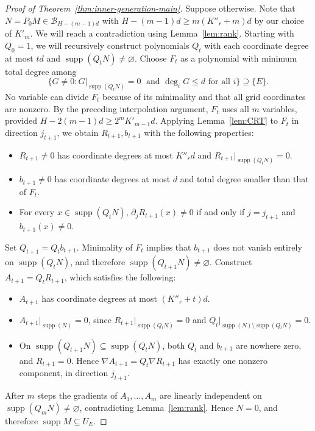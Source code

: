 \documentclass[11pt,letterpaper]{article}
\renewcommand{\le}{\leqslant}
\renewcommand{\ge}{\geqslant}
\theoremstyle{definition}
\theoremstyle{remark}
\newcommand{\supp}{\operatorname{supp}}
\begin{document}
\begin{proof}[Proof of Theorem~\ref{thm:inner-generation-main}]
Suppose otherwise. Note that  $N = P_0 M \in \mathcal B_{H-(m-1)d}$ with \(H-(m-1)d\ge m(K''_r+m)d\) by our choice of $K'_m$. We will reach a contradiction using  Lemma~\ref{lem:rank}. Starting with $Q_0=1$, we will recursively construct polynomials $Q_t$ with each coordinate degree at most $td$ and $\supp(Q_t N)\ne\varnothing$.
Choose $F_t$ as a polynomial with minimum total degree among \[\{G \neq 0: G|_{\supp(Q_t N)} = 0\; \text{  and } \deg_i G \le d \text{ for all } i\} \supseteq \{E\}.\]
No variable can divide $F_t$ because of its minimality and that all grid coordinates are nonzero. By the preceding
interpolation argument, $F_t$ uses all $m$ variables, provided
$H-2(m-1)d\ge2^mK'_{m-1}d$.
Applying Lemma~\ref{lem:CRT} to $F_t$ in direction $j_{t+1}$, we obtain $R_{t+1}, b_{t+1}$ with the following properties:
\begin{itemize}
    \item $R_{t+1} \neq 0$ has coordinate degrees at most $K''_r d$ and $R_{t+1}|_{\supp (Q_t N)} = 0$.
    \item $b_{t+1} \neq 0$ has coordinate degrees at most $d$ and total degree smaller than that of $F_t$.
    \item For every $x \in \supp(Q_t N)$, $\partial_j R_{t+1}(x) \neq 0$ if and only if $j = j_{t+1}$ and $b_{t+1}(x) \neq 0$.
\end{itemize}
Set $Q_{t+1}=Q_tb_{t+1}$. Minimality of $F_t$ implies that
$b_{t+1}$ does not vanish entirely on $\supp(Q_t N)$, and therefore $\supp(Q_{t+1} N) \neq \varnothing$.
Construct $A_{t+1} = Q_t R_{t+1}$, which satisfies the following:
\begin{itemize}
    \item $A_{t+1}$ has coordinate degrees at most
$(K''_r+t)d$.
    \item $A_{t+1}|_{\supp(N)} = 0$, since $R_{t+1}|_{\supp(Q_t N)} = 0$ and $Q_t|_{\supp(N)\setminus \supp(Q_t N)} = 0$.
    \item On $\supp(Q_{t+1} N) \subseteq \supp(Q_{t} N)$, both $Q_t$ and $b_{t+1}$ are nowhere zero, and $R_{t+1} = 0$. Hence $\nabla A_{t+1}=Q_t\nabla R_{t+1}$ has exactly one
nonzero component, in direction $j_{t+1}$.
\end{itemize}
After $m$ steps the gradients of $A_1,\ldots,A_m$ are linearly independent
on $\supp(Q_{m} N)\ne\varnothing$, contradicting Lemma~\ref{lem:rank}.
Hence $N = 0$, and therefore $\supp M\subseteq U_E$.


\end{proof}
\end{document}
